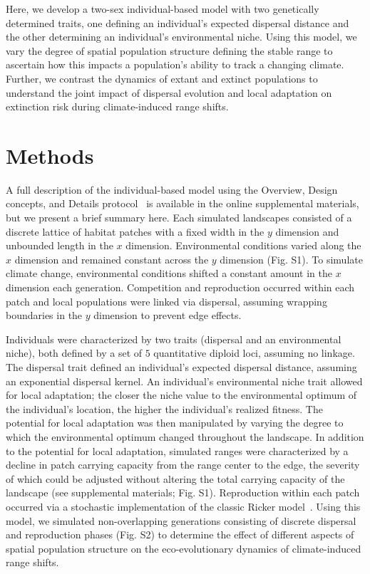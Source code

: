 \documentclass[12pt, oneside]{article}
\begin{document}
Here, we develop a two-sex individual-based model with two genetically determined traits, one defining an individual's expected dispersal distance and the other determining an individual's environmental niche. Using this model, we vary the degree of spatial population structure defining the stable range to ascertain how this impacts a population's ability to track a changing climate. Further, we contrast the dynamics of extant and extinct populations to understand the joint impact of dispersal evolution and local adaptation on extinction risk during climate-induced range shifts.

\section*{Methods}
A full description of the individual-based model using the Overview, Design concepts, and Details protocol~\citep{grimm2010odd} is available in the online supplemental materials, but we present a brief summary here. Each simulated landscapes consisted of a discrete lattice of habitat patches with a fixed width in the $y$ dimension and unbounded length in the $x$ dimension. Environmental conditions varied along the $x$ dimension and remained constant across the $y$ dimension (Fig. S1). To simulate climate change, environmental conditions shifted a constant amount in the $x$ dimension each generation. Competition and reproduction occurred within each patch and local populations were linked via dispersal, assuming wrapping boundaries in the $y$ dimension to prevent edge effects. 

Individuals were characterized by two traits (dispersal and an environmental niche), both defined by a set of $5$ quantitative diploid loci, assuming no linkage. The dispersal trait defined an individual's expected dispersal distance, assuming an exponential dispersal kernel. An individual's environmental niche trait allowed for local adaptation; the closer the niche value to the environmental optimum of the individual's location, the higher the individual's realized fitness. The potential for local adaptation was then manipulated by varying the degree to which the environmental optimum changed throughout the landscape. In addition to the potential for local adaptation, simulated ranges were characterized by a decline in patch carrying capacity from the range center to the edge, the severity of which could be adjusted without altering the total carrying capacity of the landscape (see supplemental materials; Fig. S1). Reproduction within each patch occurred via a stochastic implementation of the classic Ricker model~\citep{ricker1954stock, melbourne2008extinction}. Using this model, we simulated non-overlapping generations consisting of discrete dispersal and reproduction phases (Fig. S2) to determine the effect of different aspects of spatial population structure on the eco-evolutionary dynamics of climate-induced range shifts.
\end{document}
